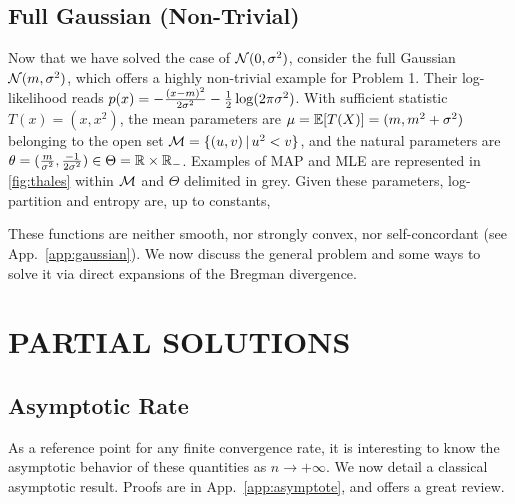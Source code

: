 \documentclass[twoside]{article}
\let\oldsection\section
\renewcommand{\section}[1]{\oldsection{\texorpdfstring{\uppercase{#1}}{#1}}}
\newcommand{\cond}{\,\vert\,}
\newcommand{\logpart}{A}
\newcommand{\conj}{\logpart^*}
\newcommand{\nat}{\theta}
\newcommand{\m}{\mu}
\begin{document}
\subsection{Full Gaussian (Non-Trivial)}
\label{ssec:gaussian}
Now that we have solved the case of ${\mathcal N}(0,\sigma^2)$, consider the full Gaussian ${\mathcal N}(m,\sigma^2)$, which offers a highly non-trivial example for Problem 1.
Their log-likelihood reads $p(x) = -\frac{(x-m)^2}{2 \sigma^2} - \frac{1}{2} \log(2\pi\sigma^2)$.
With sufficient statistic $T(x)=(x, x^2)$,
the mean parameters are $\m = \E[T(X)] = (m , m^2 + \sigma^2)$ belonging to the open set $\cM= \{(u,v) \cond u^2 < v\}$,
and the natural parameters are $\nat= (\frac{m}{\sigma^2} , \frac{-1}{2\sigma^2}) \in \Theta = \real \times \real_-$.
Examples of MAP and MLE  are represented in \cref{fig:thales} within ${\mathcal M}$ and $\Theta$ delimited in grey.
Given these parameters, log-partition and entropy are, up to constants,
\alignn{
	\textstyle \logpart(\nat) &= \textstyle \frac{\nat_1^2}{-4\nat_2} - \half \log(-2\nat_2) \\
	\textstyle \conj(\m) &= \textstyle - \half \log (\mu_2 - \mu_1^2)
}

These functions are neither smooth, nor strongly convex, nor self-concordant (see App.~\ref{app:gaussian}).
We now discuss the general problem and some ways to solve it via direct expansions of the Bregman divergence.

\section{Partial Solutions}
\label{sec:insights}

\subsection{Asymptotic Rate}
\label{ssec:asymptote}
As a reference point for any finite convergence rate, it is interesting to know the asymptotic behavior of these quantities as $n \rightarrow +\infty$.
We now detail a classical asymptotic result.
Proofs are in App.~\ref{app:asymptote}, and \citet[\S1.1]{ostrovskii2021finite} offers a great review.
\end{document}

